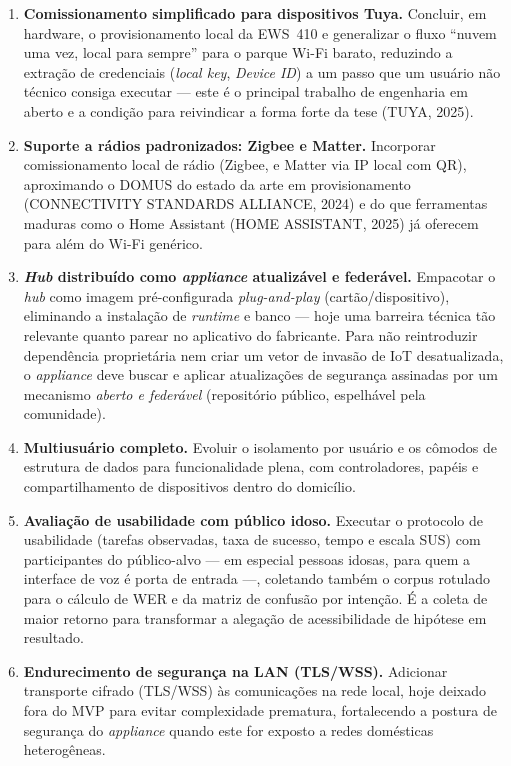 \begin{enumerate}
  \item \textbf{Comissionamento simplificado para dispositivos Tuya.} Concluir, em
  hardware, o provisionamento local da EWS~410 e generalizar o fluxo ``nuvem uma vez,
  local para sempre'' para o parque Wi-Fi barato, reduzindo a extração de credenciais
  (\textit{local key}, \textit{Device ID}) a um passo que um usuário não técnico consiga
  executar --- este é o principal trabalho de engenharia em aberto e a condição para
  reivindicar a forma forte da tese (TUYA, 2025).

  \item \textbf{Suporte a rádios padronizados: Zigbee e Matter.} Incorporar
  comissionamento local de rádio (Zigbee, e Matter via IP local com QR), aproximando o
  DOMUS do estado da arte em provisionamento (CONNECTIVITY STANDARDS ALLIANCE, 2024) e do
  que ferramentas maduras como o Home Assistant (HOME ASSISTANT, 2025) já oferecem para
  além do Wi-Fi genérico.

  \item \textbf{\textit{Hub} distribuído como \textit{appliance} atualizável e
  federável.} Empacotar o \textit{hub} como imagem pré-configurada \textit{plug-and-play}
  (cartão/dispositivo), eliminando a instalação de \textit{runtime} e banco --- hoje uma
  barreira técnica tão relevante quanto parear no aplicativo do fabricante. Para não
  reintroduzir dependência proprietária nem criar um vetor de invasão de IoT
  desatualizada, o \textit{appliance} deve buscar e aplicar atualizações de segurança
  assinadas por um mecanismo \emph{aberto e federável} (repositório público, espelhável
  pela comunidade).

  \item \textbf{Multiusuário completo.} Evoluir o isolamento por usuário e os cômodos de
  estrutura de dados para funcionalidade plena, com controladores, papéis e
  compartilhamento de dispositivos dentro do domicílio.

  \item \textbf{Avaliação de usabilidade com público idoso.} Executar o protocolo de
  usabilidade (tarefas observadas, taxa de sucesso, tempo e escala SUS) com participantes
  do público-alvo --- em especial pessoas idosas, para quem a interface de voz é porta de
  entrada ---, coletando também o corpus rotulado para o cálculo de WER e da matriz de
  confusão por intenção. É a coleta de maior retorno para transformar a alegação de
  acessibilidade de hipótese em resultado.

  \item \textbf{Endurecimento de segurança na LAN (TLS/WSS).} Adicionar transporte
  cifrado (TLS/WSS) às comunicações na rede local, hoje deixado fora do MVP para evitar
  complexidade prematura, fortalecendo a postura de segurança do \textit{appliance}
  quando este for exposto a redes domésticas heterogêneas.
\end{enumerate}

